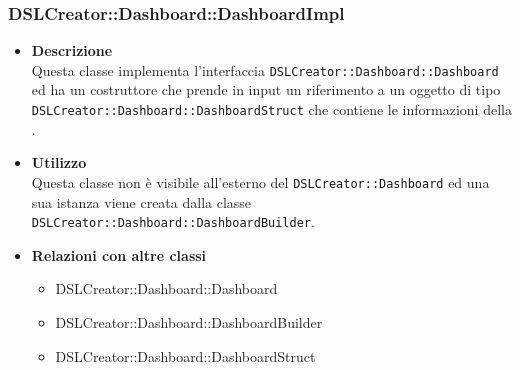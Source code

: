                 \subsubsection{DSLCreator::Dashboard::DashboardImpl}
                    \begin{itemize}
                        \item \textbf{Descrizione} \hfill \\
                            Questa classe implementa l'interfaccia \texttt{DSLCreator::Dashboard::Dashboard} ed ha un costruttore che prende in input un riferimento a un oggetto di tipo \\ \texttt{DSLCreator::Dashboard::DashboardStruct} che contiene le informazioni della .
                        \item \textbf{Utilizzo} \hfill \\
                            Questa classe non è visibile all'esterno del  \texttt{DSLCreator::Dashboard} ed una sua istanza viene creata dalla classe \texttt{DSLCreator::Dashboard::DashboardBuilder}.
                        \item \textbf{Relazioni con altre classi}
                            \begin{itemize}
                              \item DSLCreator::Dashboard::Dashboard
                              \item DSLCreator::Dashboard::DashboardBuilder
                              \item DSLCreator::Dashboard::DashboardStruct
                            \end{itemize}
                    \end{itemize}

